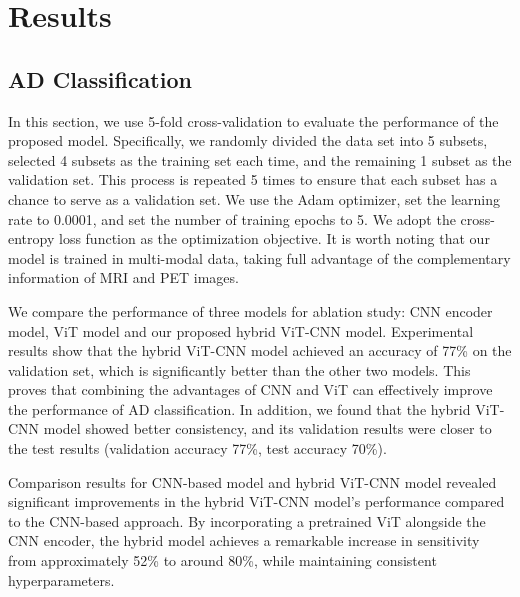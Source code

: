 \section{Results}
\label{sec:results}
\subsection{AD Classification}
In this section, we use 5-fold cross-validation to evaluate the performance of the proposed model. Specifically, we randomly divided the data set into 5 subsets, selected 4 subsets as the training set each time, and the remaining 1 subset as the validation set. This process is repeated 5 times to ensure that each subset has a chance to serve as a validation set. We use the Adam optimizer, set the learning rate to 0.0001, and set the number of training epochs to 5. We adopt the cross-entropy loss function as the optimization objective. It is worth noting that our model is trained in multi-modal data, taking full advantage of the complementary information of MRI and PET images. 

We compare the performance of three models for ablation study: CNN encoder model, ViT model and our proposed hybrid ViT-CNN model. Experimental results show that the hybrid ViT-CNN model achieved an accuracy of 77\% on the validation set, which is significantly better than the other two models. This proves that combining the advantages of CNN and ViT can effectively improve the performance of AD classification. In addition, we found that the hybrid ViT-CNN model showed better consistency, and its validation results were closer to the test results (validation accuracy 77\%, test accuracy 70\%). 

Comparison results for CNN-based model and hybrid ViT-CNN model revealed significant improvements in the hybrid ViT-CNN model's performance compared to the CNN-based approach. By incorporating a pretrained ViT alongside the CNN encoder, the hybrid model achieves a remarkable increase in sensitivity from approximately 52\% to around 80\%, while maintaining consistent hyperparameters. 
    

